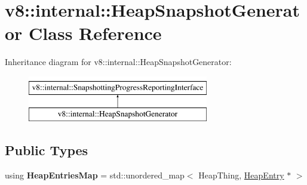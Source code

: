 \hypertarget{classv8_1_1internal_1_1HeapSnapshotGenerator}{}\section{v8\+:\+:internal\+:\+:Heap\+Snapshot\+Generator Class Reference}
\label{classv8_1_1internal_1_1HeapSnapshotGenerator}
Inheritance diagram for v8\+:\+:internal\+:\+:Heap\+Snapshot\+Generator\+:\begin{figure}[H]
\begin{center}
\leavevmode
\includegraphics[height=2.000000cm]{classv8_1_1internal_1_1HeapSnapshotGenerator}
\end{center}
\end{figure}
\subsection*{Public Types}
\begin{DoxyCompactItemize}
\item 
\mbox{\label{classv8_1_1internal_1_1HeapSnapshotGenerator_a2fe2fd0f5101ab7ca5890a0c1f8d9663}} 
using {\bfseries Heap\+Entries\+Map} = std\+::unordered\+\_\+map$<$ Heap\+Thing, \mbox{\hyperlink{classv8_1_1internal_1_1HeapEntry}{Heap\+Entry}} $\ast$ $>$
\end{DoxyCompactItemize}
